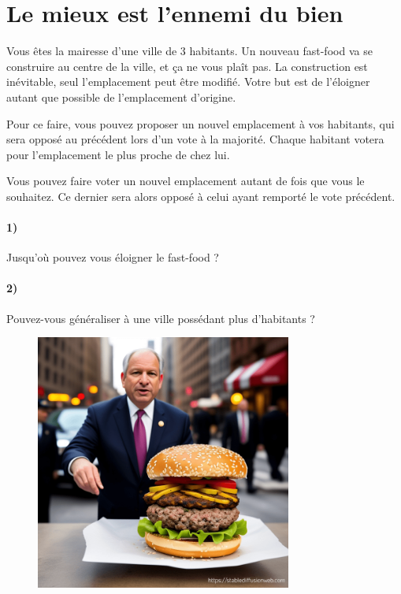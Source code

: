 \documentclass[a4paper,10pt,oneside]{article}
\begin{document}
\section{Le mieux est l'ennemi du bien}

Vous êtes la mairesse d'une ville de 3 habitants.
Un nouveau fast-food va se construire au centre de la ville, et ça ne vous plaît pas.
La construction est inévitable, seul l'emplacement peut être modifié.
Votre but est de l'éloigner autant que possible de l'emplacement d'origine.

Pour ce faire, vous pouvez proposer un nouvel emplacement à vos habitants, qui sera opposé au précédent lors d'un vote à la majorité.
Chaque habitant votera pour l'emplacement le plus proche de chez lui.

Vous pouvez faire voter un nouvel emplacement autant de fois que vous le souhaitez.
Ce dernier sera alors opposé à celui ayant remporté le vote précédent.


\paragraph*{1)} 
Jusqu'où pouvez vous éloigner le fast-food ?

\paragraph*{2)} 
Pouvez-vous généraliser à une ville possédant plus d'habitants ?


\vspace{3cm}
\begin{figure}[!ht]
  \centering
  \includegraphics[width=0.75\textwidth]{figures/fast-food.png}
\end{figure}
\end{document}
